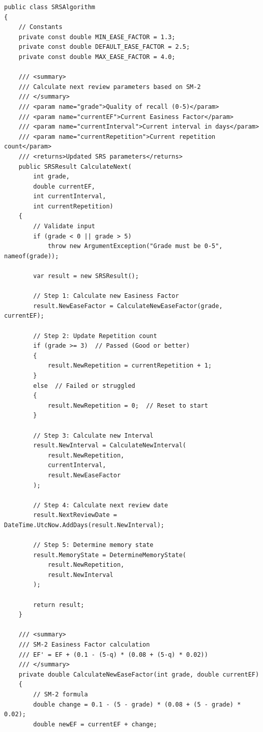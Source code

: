 \begin{lstlisting}[caption={Hien thuc thuat toan SM-2 trong he thong}, label={lst:sm2algo}]
public class SRSAlgorithm
{
    // Constants
    private const double MIN_EASE_FACTOR = 1.3;
    private const double DEFAULT_EASE_FACTOR = 2.5;
    private const double MAX_EASE_FACTOR = 4.0;

    /// <summary>
    /// Calculate next review parameters based on SM-2
    /// </summary>
    /// <param name="grade">Quality of recall (0-5)</param>
    /// <param name="currentEF">Current Easiness Factor</param>
    /// <param name="currentInterval">Current interval in days</param>
    /// <param name="currentRepetition">Current repetition count</param>
    /// <returns>Updated SRS parameters</returns>
    public SRSResult CalculateNext(
        int grade,
        double currentEF,
        int currentInterval,
        int currentRepetition)
    {
        // Validate input
        if (grade < 0 || grade > 5)
            throw new ArgumentException("Grade must be 0-5", nameof(grade));

        var result = new SRSResult();

        // Step 1: Calculate new Easiness Factor
        result.NewEaseFactor = CalculateNewEaseFactor(grade, currentEF);

        // Step 2: Update Repetition count
        if (grade >= 3)  // Passed (Good or better)
        {
            result.NewRepetition = currentRepetition + 1;
        }
        else  // Failed or struggled
        {
            result.NewRepetition = 0;  // Reset to start
        }

        // Step 3: Calculate new Interval
        result.NewInterval = CalculateNewInterval(
            result.NewRepetition,
            currentInterval,
            result.NewEaseFactor
        );

        // Step 4: Calculate next review date
        result.NextReviewDate = DateTime.UtcNow.AddDays(result.NewInterval);

        // Step 5: Determine memory state
        result.MemoryState = DetermineMemoryState(
            result.NewRepetition,
            result.NewInterval
        );

        return result;
    }

    /// <summary>
    /// SM-2 Easiness Factor calculation
    /// EF' = EF + (0.1 - (5-q) * (0.08 + (5-q) * 0.02))
    /// </summary>
    private double CalculateNewEaseFactor(int grade, double currentEF)
    {
        // SM-2 formula
        double change = 0.1 - (5 - grade) * (0.08 + (5 - grade) * 0.02);
        double newEF = currentEF + change;


\end{lstlisting}
